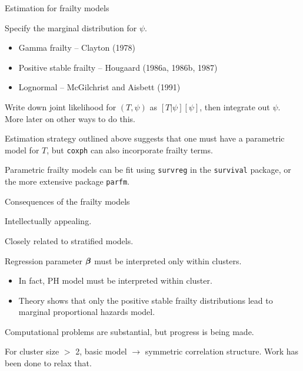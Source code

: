 \documentclass[ignorenonframetext,]{beamer}
\newcommand{\bbeta}{\mbox{\boldmath$\beta$}}
\begin{document}
\begin{frame}{%
\protect\hypertarget{estimation-for-frailty-models}{%
Estimation for frailty models}}

Specify the marginal distribution for \(\psi\).

\begin{itemize}
\item
  Gamma frailty – Clayton (1978)
\item
  Positive stable frailty – Hougaard (1986a, 1986b, 1987)
\item
  Lognormal – McGilchrist and Aisbett (1991)
\end{itemize}

Write down joint likelihood for \((T, \psi)\) as \([T | \psi] [\psi]\),
then integrate out \(\psi\). More later on other ways to do this.

Estimation strategy outlined above suggests that one must have a
parametric model for \(T\), but \texttt{coxph} can also incorporate
frailty terms.

Parametric frailty models can be fit using \texttt{survreg} in the
\texttt{survival} package, or the more extensive package \texttt{parfm}.

\end{frame}

\begin{frame}{%
\protect\hypertarget{consequences-of-the-frailty-models}{%
Consequences of the frailty models}}

Intellectually appealing.

Closely related to stratified models.

Regression parameter \(\bbeta\) must be interpreted only within
clusters.

\begin{itemize}
\item
  In fact, PH model must be interpreted within cluster.
\item
  Theory shows that only the positive stable frailty distributions lead
  to marginal proportional hazards model.
\end{itemize}

Computational problems are substantial, but progress is being made.

For cluster size \(>\) 2, basic model \(\longrightarrow\) symmetric
correlation structure. Work has been done to relax that.

\end{frame}
\end{document}
